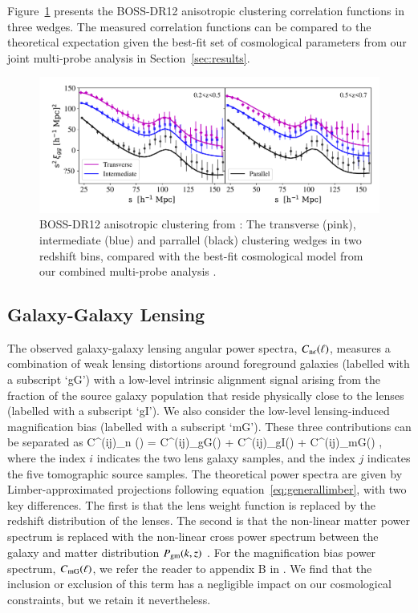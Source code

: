 Figure~\ref{fig:wedges} presents the \citet{sanchez/etal:2017} BOSS-DR12 anisotropic clustering correlation functions in three wedges.   The measured correlation functions can be compared to the theoretical expectation given the best-fit set of cosmological parameters from our joint multi-probe analysis in Section~\ref{sec:results}.

\begin{figure}
        \includegraphics[width=\textwidth]{Data_Plots/clustering_wedges/BOSS_Sanchez_wedges.pdf}
        \caption{BOSS-DR12 anisotropic clustering from \citet{sanchez/etal:2017}:
          The transverse (pink), intermediate (blue) and parrallel
          (black) clustering wedges in two redshift bins, compared 
          with the best-fit
          cosmological model from our combined multi-probe analysis
          .}
        \label{fig:wedges}
\end{figure}

\subsection{Galaxy-Galaxy Lensing}
\label{sec:GGL}
The observed galaxy-galaxy lensing angular power spectra, $C_{\rm n \epsilon}(\ell)$, measures a combination of weak lensing distortions around foreground galaxies (labelled with a subscript `gG') with a low-level intrinsic alignment signal arising from the fraction of the source galaxy population that reside physically close to the lenses (labelled with a subscript `gI').   We also consider the low-level lensing-induced magnification bias (labelled with a subscript `mG').   These three contributions can be separated as 
\be
\label{eq:cl_ggl}
C^{(ij)}_{\rm n \epsilon}(\ell) = C^{(ij)}_{\rm gG}(\ell) +
C^{(ij)}_{\rm gI}(\ell) + C^{(ij)}_{\rm mG}(\ell)  \;,
\ee
where the index $i$ indicates the two lens galaxy samples, and the index $j$ indicates the five tomographic source samples.   The theoretical power spectra are given by Limber-approximated projections following equation~\ref{eq:generallimber}, with two key differences.   The first is that the lens weight function is replaced by the redshift distribution of the lenses.   The second is that the non-linear matter power spectrum is replaced with the non-linear cross power spectrum between the galaxy and matter distribution $P_{\rm gm}(k,z)$ \citep[see equations 24 and 25 of][for the full expressions]{joachimi/etal:inprep}.   For the magnification bias power spectrum, $C_{\rm mG}(\ell)$, we refer the reader to appendix B in \citet{joachimi/etal:inprep}.   We find that the inclusion or exclusion of this term has a negligible impact on our cosmological constraints, but we retain it nevertheless.

